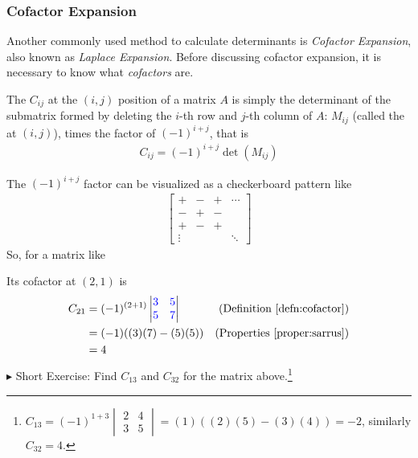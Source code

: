 \subsubsection{Cofactor Expansion}
Another commonly used method to calculate determinants is \textit{Cofactor Expansion}, also known as \textit{Laplace Expansion}. Before discussing cofactor expansion, it is necessary to know what \textit{cofactors} are.
\begin{defn}
\label{defn:cofactor}
The  $C_{ij}$ at the $(i, j)$ position of a matrix $A$ is simply the determinant of the submatrix formed by deleting the $i$-th row and $j$-th column of $A$: $M_{ij}$ (called the  at $(i, j)$), times the factor of $(-1)^{i+j}$, that is
\begin{align}
C_{ij} = (-1)^{i+j} \det(M_{ij})    
\end{align}
\end{defn}
The $(-1)^{i+j}$ factor can be visualized as a checkerboard pattern like
\begin{align*}
\begin{bmatrix}
+ & - & + & \cdots \\
- & + & - &  \\
+ & - & + &  \\
\vdots & &  & \ddots
\end{bmatrix}
\end{align*}
So, for a matrix like
\begin{center}
\end{center}
Its cofactor at $(2, 1)$ is
\begin{align*}
C_{21} &= (-1)^{(2+1)}
\begin{vmatrix}
\mathcolor{blue}{3} & \mathcolor{blue}{5} \\
\mathcolor{blue}{5} & \mathcolor{blue}{7}
\end{vmatrix} & \text{(Definition \ref{defn:cofactor})} \\
&= (-1)((3)(7) - (5)(5)) & \text{(Properties \ref{proper:sarrus})} \\
&= 4
\end{align*}
$\blacktriangleright$ Short Exercise: Find $C_{13}$ and $C_{32}$ for the matrix above.\footnote{$C_{13} = (-1)^{1+3}\begin{vmatrix}
2 & 4 \\
3 & 5
\end{vmatrix} = (1)((2)(5)-(3)(4)) = -2$, similarly $C_{32} = 4$.}\par

